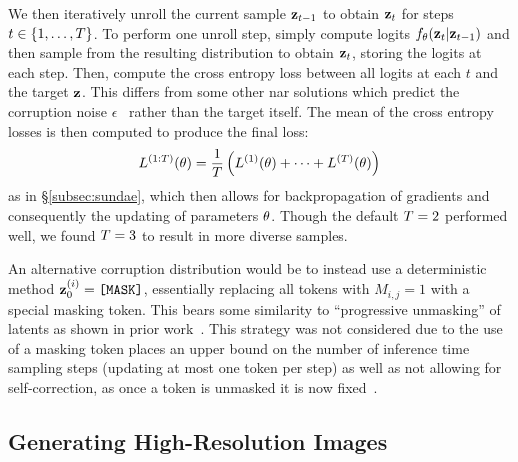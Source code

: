 We then iteratively unroll the current sample $\mathbf{z}_{t-1}$ to obtain
$\mathbf{z}_t$ for steps $t\in \{1, \dots, T\}$. To perform one unroll
step, simply compute logits $f_\theta(\mathbf{z}_t \vert \mathbf{z}_{t-1})$ and then
sample from the resulting distribution to obtain $\mathbf{z}_t$, storing the logits
at each step. Then, compute the cross entropy loss between all logits at each
$t$ and the target $\mathbf{z}$. This differs from some other \gls{nar} solutions
which predict the corruption noise $\epsilon$~\cite{ho2020ddpm} rather than the
target itself. The mean of the cross entropy losses is then computed to produce
the final loss: 
\begin{equation} 
    L^{(1:T)}(\theta) = \frac{1}{T} \left(L^{(1)}(\theta) +
    \dots + L^{(T)}(\theta) \right) 
\end{equation} 
as in \S\ref{subsec:sundae}, which then allows for backpropagation of gradients
and consequently the updating of parameters $\theta$. Though the
default $T = 2$ performed well, we found $T = 3$ to result
in more diverse samples.

An alternative corruption distribution would be to instead use a deterministic
method $\mathbf{z}_0^{(i)}=\texttt{[MASK]}$, essentially replacing all tokens with
$M_{i,j} = 1$ with a special masking token. This bears some similarity to
``progressive unmasking'' of latents as shown in prior
work~\cite{bondtaylor2021unleashing,austin2021structured}. This strategy was not
considered due to the use of a masking token places an upper bound on the number of
inference time sampling steps (updating at most one token per step) as well as
not allowing for self-correction, as once a token is unmasked it is now
fixed~\cite{bondtaylor2021unleashing,austin2021structured}. 


\subsection{Generating High-Resolution Images}
\label{subsec:sundaeSampling}



